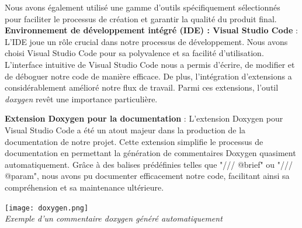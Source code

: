 \documentclass[10pt]{article}
\begin{document}
Nous avons également utilisé une gamme d'outils spécifiquement sélectionnés pour faciliter le processus de création et garantir la qualité du produit final.
\textbf{Environnement de développement intégré (IDE) : Visual Studio Code} :
L'IDE joue un rôle crucial dans notre processus de développement. Nous avons choisi Visual Studio Code pour sa polyvalence et sa facilité d'utilisation. L'interface intuitive de Visual Studio Code nous a permis d'écrire, de modifier et de déboguer notre code de manière efficace. De plus, l'intégration d'extensions a considérablement amélioré notre flux de travail. Parmi ces extensions, l'outil \textit{\gls{doxygen}} revêt une importance particulière.

\textbf{Extension Doxygen pour la documentation} :
L'extension Doxygen pour Visual Studio Code a été un atout majeur dans la production de la documentation de notre projet. Cette extension simplifie le processus de documentation en permettant la génération de commentaires Doxygen quasiment automatiquement. Grâce à des balises prédéfinies telles que "/// @brief" ou "/// @param", nous avons pu documenter efficacement notre code, facilitant ainsi sa compréhension et sa maintenance ultérieure.
\begin{center}
\texttt{[image: doxygen.png]}\\
\caption{{\emph{Exemple d'un commentaire doxygen généré automatiquement}}}
\label{fig8}\\
\end{center}
\end{document}
